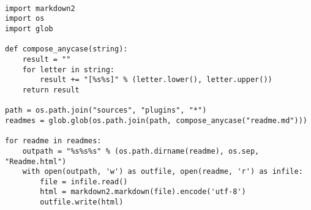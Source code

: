  \label{apx:mdtohtml}
\begin{lstlisting}
  
import markdown2
import os
import glob

def compose_anycase(string):
	result = ""
	for letter in string:
		result += "[%s%s]" % (letter.lower(), letter.upper())
	return result
		
path = os.path.join("sources", "plugins", "*")
readmes = glob.glob(os.path.join(path, compose_anycase("readme.md")))

for readme in readmes:
	outpath = "%s%s%s" % (os.path.dirname(readme), os.sep, "Readme.html")
	with open(outpath, 'w') as outfile, open(readme, 'r') as infile:
		file = infile.read()
		html = markdown2.markdown(file).encode('utf-8')
		outfile.write(html)
\end{lstlisting}
